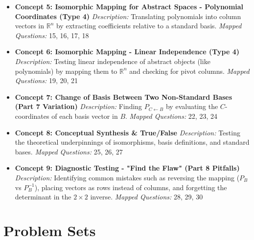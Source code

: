 \documentclass{article}
\begin{document}
\begin{itemize}
    \item \textbf{Concept 5: Isomorphic Mapping for Abstract Spaces - Polynomial Coordinates (Type 4)}
    \newline \textit{Description:} Translating polynomials into column vectors in $\mathbb{R}^n$ by extracting coefficients relative to a standard basis.
    \newline \textit{Mapped Questions:} 15, 16, 17, 18
    
    \item \textbf{Concept 6: Isomorphic Mapping - Linear Independence (Type 4)}
    \newline \textit{Description:} Testing linear independence of abstract objects (like polynomials) by mapping them to $\mathbb{R}^n$ and checking for pivot columns.
    \newline \textit{Mapped Questions:} 19, 20, 21
    
    \item \textbf{Concept 7: Change of Basis Between Two Non-Standard Bases (Part 7 Variation)}
    \newline \textit{Description:} Finding $P_{C \leftarrow B}$ by evaluating the $C$-coordinates of each basis vector in $B$.
    \newline \textit{Mapped Questions:} 22, 23, 24
    
    \item \textbf{Concept 8: Conceptual Synthesis \& True/False}
    \newline \textit{Description:} Testing the theoretical underpinnings of isomorphisms, basis definitions, and standard bases.
    \newline \textit{Mapped Questions:} 25, 26, 27
    
    \item \textbf{Concept 9: Diagnostic Testing - "Find the Flaw" (Part 8 Pitfalls)}
    \newline \textit{Description:} Identifying common mistakes such as reversing the mapping ($P_B$ vs $P_B^{-1}$), placing vectors as rows instead of columns, and forgetting the determinant in the $2 \times 2$ inverse.
    \newline \textit{Mapped Questions:} 28, 29, 30
\end{itemize}

\newpage

\section{Problem Sets}
\end{document}
